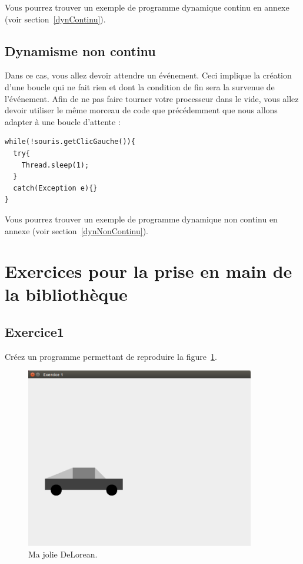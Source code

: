 \documentclass[12pt]{exam}
\begin{document}
Vous pourrez trouver un exemple de programme dynamique continu en annexe (voir section~\ref{dynContinu}).

\subsection{Dynamisme non continu}
Dans ce cas, vous allez devoir attendre un événement. Ceci implique la création d'une boucle qui ne fait rien et dont la condition de fin sera la survenue de l'événement. Afin de ne pas faire tourner votre processeur dans le vide, vous allez devoir utiliser le même morceau de code que précédemment que nous allons adapter à une boucle d'attente :
\begin{lstlisting}
while(!souris.getClicGauche()){
  try{
    Thread.sleep(1);
  }
  catch(Exception e){}
}
\end{lstlisting}

Vous pourrez trouver un exemple de programme dynamique non continu en annexe (voir section~\ref{dynNonContinu}).

\newpage

\section{Exercices pour la prise en main de la bibliothèque}
\subsection{Exercice1}
Créez un programme permettant de reproduire la figure~\ref{ex1}.

\begin{figure}[htbp]
  \centering
  \includegraphics[width=10cm]{./images/Exercice1}
  \caption{\label{ex1}Ma jolie DeLorean.}
\end{figure}
\end{document}
